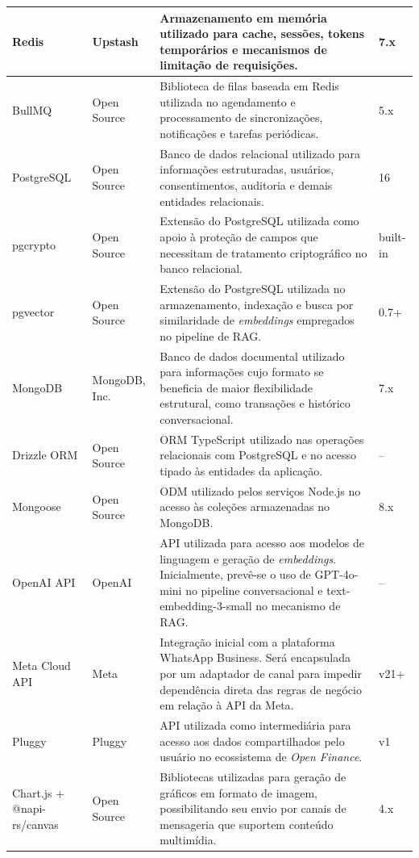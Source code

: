 {\begin{longtable}{|L{3.2cm}|L{2.8cm}|L{6.7cm}|L{1.5cm}|}
Redis & Upstash & Armazenamento em memória utilizado para cache, sessões, tokens temporários e mecanismos de limitação de requisições. & 7.x \\ \hline
BullMQ & Open Source & Biblioteca de filas baseada em Redis utilizada no agendamento e processamento de sincronizações, notificações e tarefas periódicas. & 5.x \\ \hline
PostgreSQL & Open Source & Banco de dados relacional utilizado para informações estruturadas, usuários, consentimentos, auditoria e demais entidades relacionais. & 16 \\ \hline
pgcrypto & Open Source & Extensão do PostgreSQL utilizada como apoio à proteção de campos que necessitam de tratamento criptográfico no banco relacional. & built-in \\ \hline
pgvector & Open Source & Extensão do PostgreSQL utilizada no armazenamento, indexação e busca por similaridade de \textit{embeddings} empregados no pipeline de RAG. & 0.7+ \\ \hline
MongoDB & MongoDB, Inc. & Banco de dados documental utilizado para informações cujo formato se beneficia de maior flexibilidade estrutural, como transações e histórico conversacional. & 7.x \\ \hline
Drizzle ORM & Open Source & ORM TypeScript utilizado nas operações relacionais com PostgreSQL e no acesso tipado às entidades da aplicação. & -- \\ \hline
Mongoose & Open Source & ODM utilizado pelos serviços Node.js no acesso às coleções armazenadas no MongoDB. & 8.x \\ \hline
OpenAI API & OpenAI & API utilizada para acesso aos modelos de linguagem e geração de \textit{embeddings}. Inicialmente, prevê-se o uso de GPT-4o-mini no pipeline conversacional e text-embedding-3-small no mecanismo de RAG. & -- \\ \hline
Meta Cloud API & Meta & Integração inicial com a plataforma WhatsApp Business. Será encapsulada por um adaptador de canal para impedir dependência direta das regras de negócio em relação à API da Meta. & v21+ \\ \hline
Pluggy & Pluggy & API utilizada como intermediária para acesso aos dados compartilhados pelo usuário no ecossistema de \textit{Open Finance}. & v1 \\ \hline
Chart.js + @napi-rs/canvas & Open Source & Bibliotecas utilizadas para geração de gráficos em formato de imagem, possibilitando seu envio por canais de mensageria que suportem conteúdo multimídia. & 4.x \\ \hline

\end{longtable}}
